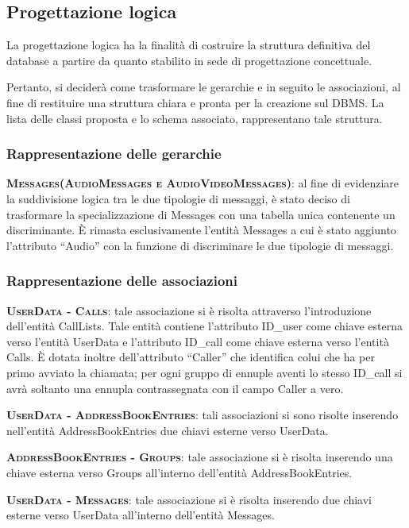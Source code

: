 \subsection{Progettazione logica}
La progettazione logica ha la finalità di costruire la struttura definitiva del database a partire da quanto stabilito in sede di progettazione concettuale.

Pertanto, si deciderà come trasformare le gerarchie e in seguito le associazioni, al fine di restituire una struttura chiara e pronta per la creazione sul DBMS\@. La lista delle classi proposta e lo schema associato, rappresentano tale struttura.

\subsubsection{Rappresentazione delle gerarchie}

\begin{description}
	\item{\scshape\bfseries Messages(AudioMessages e AudioVideoMessages)}: al fine di evidenziare la suddivisione logica tra le due tipologie di messaggi, è stato deciso di trasformare la specializzazione di Messages con una tabella unica contenente un discriminante. È rimasta esclusivamente l'entità Messages a cui è stato aggiunto l'attributo ``Audio'' con la funzione di discriminare le due tipologie di messaggi.
\end{description}

\subsubsection{Rappresentazione delle associazioni}

\begin{description}
	\item{\scshape\bfseries UserData - Calls}: tale associazione si è risolta attraverso l'introduzione dell'entità CallLists. Tale entità contiene l'attributo ID\_user come chiave esterna verso l'entità UserData e l'attributo ID\_call come chiave esterna verso l'entità Calls. È dotata inoltre dell'attributo ``Caller'' che identifica colui che ha per primo avviato la chiamata; per ogni gruppo di ennuple aventi lo stesso ID\_call si avrà soltanto una ennupla contrassegnata con il campo Caller a vero.
	
	\item{\scshape\bfseries UserData - AddressBookEntries}: tali associazioni si sono risolte inserendo nell'entità AddressBookEntries due chiavi esterne verso UserData.
	
	\item{\scshape\bfseries AddressBookEntries - Groups}: tale associazione si è risolta inserendo una chiave esterna verso Groups all'interno dell'entità AddressBookEntries.
	
	\item{\scshape\bfseries UserData - Messages}: tale associazione si è risolta inserendo due chiavi esterne verso UserData all'interno dell'entità Messages. 
\end{description}


